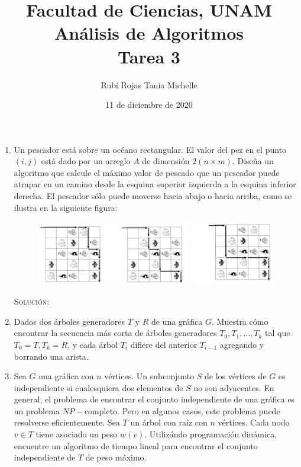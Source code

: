 \documentclass[letterpaper,11pt]{article}
\title{Facultad de Ciencias, UNAM \\ 
       Análisis de Algoritmos \\ 
       Tarea 3}
\author{Rubí Rojas Tania Michelle}
\date{11 de diciembre de 2020}
\begin{document}
\maketitle

\begin{enumerate}
    \item Un pescador está sobre un océano rectangular. El valor del pez en el 
    punto $(i, j)$ está dado por un arreglo $A$ de dimensión $2 (n \times m)$.
    Diseña un algoritmo que calcule el máximo valor de pescado que un pescador
    puede atrapar en un camino desde la esquina superior izquierda a la esquina 
    inferior derecha. El pescador sólo puede moverse hacia abajo o hacia arriba,
    como se ilustra en la siguiente figura: 
    \begin{figure}[h]
        \centering
        \includegraphics[width=0.5\linewidth]{imagenes/ejercicio1.png}
    \end{figure}

    \textsc{Solución:}

    \item Dados dos árboles generadores $T$ y $R$ de una gráfica $G$. Muestra 
    cómo encontrar la secuencia más corta de árboles generadores $T_0, T_1, 
    \ldots, T_k$ tal que $T_0 = T, T_k = R$, y cada árbol $T_i$ difiere del 
    anterior $T_{i-1}$ agregando y borrando una arista.

    \item Sea $G$ una gráfica con $n$ vértices. Un subconjunto $S$ de los 
    vértices de $G$ es independiente si cualesquiera dos elementos de $S$ no 
    son adyacentes. En general, el problema de encontrar el conjunto 
    independiente de una gráfica es un problema $NP-$completo. Pero en 
    algunos casos, este problema puede resolverse eficientemente. Sea $T$ un
    árbol con raíz con $n$ vértices. Cada nodo $v \in T$ tiene asociado un peso 
    $w(v)$. Utilizándo programación dinámica, encuentre un algoritmo de tiempo 
    lineal para encontrar el conjunto independiente de $T$ de peso máximo.


\end{enumerate}
\end{document}
